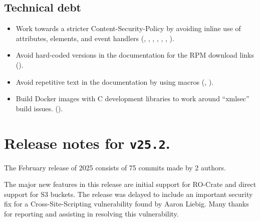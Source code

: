 \subsection*{Technical debt}
\begin{itemize}
\item{Work towards a stricter Content-Security-Policy by avoiding inline use
    of  attributes,  elements, and event handlers
    (,
    ,
    ,
    ,
    ,
    ,
    ).}
\item{Avoid hard-coded versions in the documentation for the RPM download links
    ().}
\item{Avoid repetitive text in the documentation by using macros
    (,
    ).}
\item{Build Docker images with C development libraries to work around
    ``xmlsec'' build issues.
    ().}
\end{itemize}

\section*{Release notes for \texttt{v25.2}.}

  The February release of 2025 consists of 75 commits made by 2 authors.

  The major new features in this release are initial support for RO-Crate
  and direct support for S3 buckets.  The release was delayed to include an
  important security fix for a Cross-Site-Scripting vulnerability found
  by Aaron Liebig.  Many thanks for reporting and assisting in resolving
  this vulnerability.

